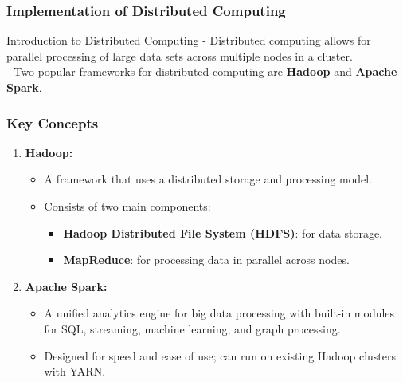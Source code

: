 \documentclass[aspectratio=169]{beamer}
\begin{document}
\begin{frame}[fragile]
    \frametitle{Implementation of Distributed Computing}
    
    \begin{block}{Introduction to Distributed Computing}
        - Distributed computing allows for parallel processing of large data sets across multiple nodes in a cluster.\\
        - Two popular frameworks for distributed computing are \textbf{Hadoop} and \textbf{Apache Spark}.
    \end{block}
\end{frame}

\begin{frame}[fragile]
    \frametitle{Key Concepts}
    
    \begin{enumerate}
        \item \textbf{Hadoop:} 
        \begin{itemize}
            \item A framework that uses a distributed storage and processing model.
            \item Consists of two main components:
              \begin{itemize}
                  \item \textbf{Hadoop Distributed File System (HDFS)}: for data storage.
                  \item \textbf{MapReduce}: for processing data in parallel across nodes.
              \end{itemize}
        \end{itemize}
        
        \item \textbf{Apache Spark:}
        \begin{itemize}
            \item A unified analytics engine for big data processing with built-in modules for SQL, streaming, machine learning, and graph processing.
            \item Designed for speed and ease of use; can run on existing Hadoop clusters with YARN.
        \end{itemize}
    \end{enumerate}
\end{frame}
\end{document}
